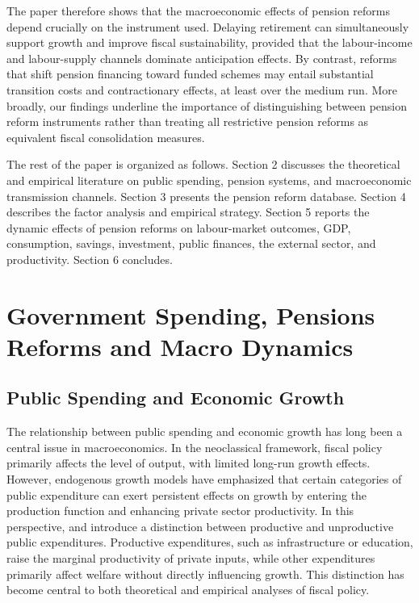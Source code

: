 \documentclass[11pt,english,a4paper, twoside, authoryear]{article}
\begin{document}
The paper therefore shows that the macroeconomic effects of pension reforms depend crucially on the instrument used. Delaying retirement can simultaneously support growth and improve fiscal sustainability, provided that the labour-income and labour-supply channels dominate anticipation effects. By contrast, reforms that shift pension financing toward funded schemes may entail substantial transition costs and contractionary effects, at least over the medium run. More broadly, our findings underline the importance of distinguishing between pension reform instruments rather than treating all restrictive pension reforms as equivalent fiscal consolidation measures.

The rest of the paper is organized as follows. Section 2 discusses the theoretical and empirical literature on public spending, pension systems, and macroeconomic transmission channels. Section 3 presents the pension reform database. Section 4 describes the factor analysis and empirical strategy. Section 5 reports the dynamic effects of pension reforms on labour-market outcomes, GDP, consumption, savings, investment, public finances, the external sector, and productivity. Section 6 concludes.


\section{Government Spending, Pensions Reforms and Macro Dynamics}

\subsection{Public Spending and Economic Growth}

The relationship between public spending and economic growth has long been a central issue in macroeconomics. In the neoclassical framework, fiscal policy primarily affects the level of output, with limited long-run growth effects. However, endogenous growth models have emphasized that certain categories of public expenditure can exert persistent effects on growth by entering the production function and enhancing private sector productivity. In this perspective, \citet{Barro1990} and \citet{Devarajan1996} introduce a distinction between productive and unproductive public expenditures. Productive expenditures, such as infrastructure or education, raise the marginal productivity of private inputs, while other expenditures primarily affect welfare without directly influencing growth. This distinction has become central to both theoretical and empirical analyses of fiscal policy.
\end{document}
